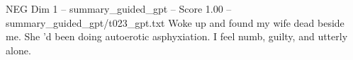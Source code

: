 \begin{textsample}{NEG Dim 1 – summary\_guided\_gpt – Score 1.00 – summary\_guided\_gpt/t023\_gpt.txt}  \label{ex:f1_neg_029}
Woke up and found my wife dead beside me.
She ’d been doing autoerotic asphyxiation.
I feel numb, guilty, and utterly alone.

\end{textsample}
